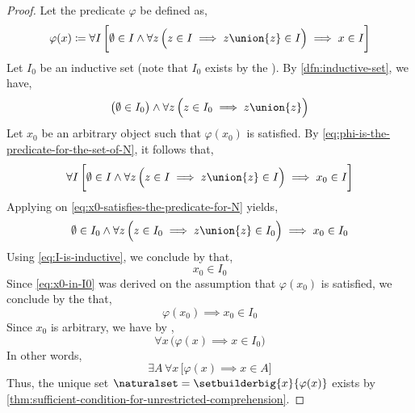 \begin{proof}
    Let the predicate \( \varphi \) be defined as,
    \begin{equation}
        \label{eq:phi-is-the-predicate-for-the-set-of-N}
        \varphi(x) \coloneq \forall I \, \bigg[ \emptyset \in I \land
        \forall z \, \Big( z \in I \implies z \union \mleft\{ z \mright\} \in I \Big)
        \implies x \in I \bigg]
    \end{equation}
    Let \( I_{0} \) be an inductive set (note that \( I_{0} \) exists by the ).
    By \cref{dfn:inductive-set}, we have,
    \begin{equation}
        \label{eq:I-is-inductive}
        \big( \emptyset \in I_{0} \big) \land \forall z \, \Big( z \in I_{0} \implies z \union \mleft\{ z \mright\} \Big)
    \end{equation}
    Let \( x_{0} \) be an arbitrary object such that \( \varphi(x_{0}) \) is satisfied. By \eqref{eq:phi-is-the-predicate-for-the-set-of-N},
    it follows that,
    \begin{equation}
        \label{eq:x0-satisfies-the-predicate-for-N}
        \forall I \, \bigg[ \emptyset \in I \land \forall z \, \Big( z \in I \implies z \union \mleft\{ z \mright\} \in I \Big) \implies x_{0} \in I \bigg]
    \end{equation}
    Applying  on \eqref{eq:x0-satisfies-the-predicate-for-N} yields,
    \begin{equation*}
        \emptyset \in I_{0} \land \forall z \, \Big( z \in I_{0} \implies z \union \mleft\{ z \mright\} \in I_{0} \Big) \implies  x_{0} \in I_{0}
    \end{equation*}
    Using \eqref{eq:I-is-inductive}, we conclude by  that,
    \begin{equation}
        \label{eq:x0-in-I0}
        x_{0} \in  I_{0}
    \end{equation}
    Since \eqref{eq:x0-in-I0} was derived on the assumption that \( \varphi(x_{0}) \) is satisfied, we conclude by the  that,
    \begin{equation*}
        \varphi(x_{0}) \implies x_{0} \in I_{0}
    \end{equation*}
    Since \( x_{0} \) is arbitrary, we have by ,
    \begin{equation*}
        \forall x \, \big( \varphi(x) \implies x \in I_{0} \big)
    \end{equation*}
    In other words,
    \begin{equation*}
        \exists A \, \forall x \, \Big[ \varphi(x) \implies x \in A \Big]
    \end{equation*}
    Thus, the unique set \( \naturalset = \setbuilderbig{x}{\varphi(x)} \) exists by \cref{thm:sufficient-condition-for-unrestricted-comprehension}.
\end{proof}

